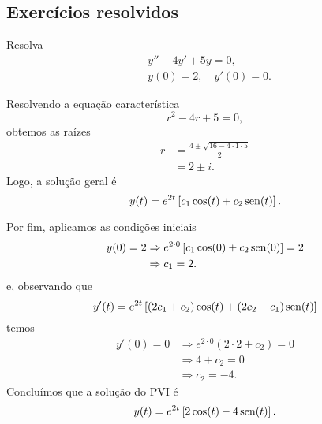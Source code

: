 \subsection*{Exercícios resolvidos}

\begin{exeresol}
  Resolva
  \begin{align}
    &y'' - 4y' + 5y = 0,\\
    &y(0) = 2,\quad y'(0)=0.
  \end{align}
\end{exeresol}
\begin{resol}
  Resolvendo a equação característica
  \begin{equation}
    r^2 - 4r + 5 = 0,
  \end{equation}
  obtemos as raízes
  \begin{align}
    r &= \frac{4 \pm \sqrt{16 - 4\cdot 1\cdot 5}}{2} \\
      &= 2 \pm i.
  \end{align}
  Logo, a solução geral é
  \begin{equation}
    y(t) = e^{2t}\left[c_1\cos(t) + c_2\operatorname{sen}(t)\right].
  \end{equation}

  Por fim, aplicamos as condições iniciais
  \begin{align}
    y(0) = 2 &\Rightarrow e^{2\cdot 0}\left[c_1\cos(0) + c_2\operatorname{sen}(0)\right] = 2 \\
             &\Rightarrow c_1 = 2.
  \end{align}
  e, observando que
  \begin{equation}
    y'(t) = e^{2t}\left[(2c_1 + c_2)\cos(t) + (2c_2 - c_1)\operatorname{sen}(t)\right]
  \end{equation}
  temos
  \begin{align}
    y'(0) = 0 &\Rightarrow e^{2\cdot 0}(2\cdot 2 + c_2) = 0 \\
              &\Rightarrow 4 + c_2 = 0 \\
              &\Rightarrow c_2 = -4.
  \end{align}
  Concluímos que a solução do PVI é
  \begin{equation}
    y(t) = e^{2t}\left[2\cos(t) - 4\operatorname{sen}(t)\right].
  \end{equation}
\end{resol}

